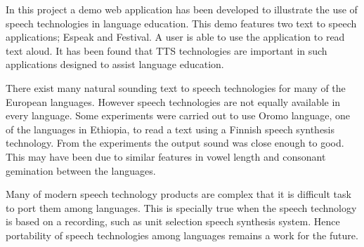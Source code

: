 \documentclass[11pt,a4paper,oneside,article]{memoir}
\begin{document}
In this project a demo web application has been developed to illustrate the use of speech technologies in language education. This demo features two text to speech applications; Espeak and Festival. A user is able to use the application to read text aloud. It has been found that TTS technologies are important in such applications designed to assist language education.

There exist many natural sounding text to speech technologies for many of the European languages. However speech technologies are not equally available in every language. Some experiments were carried out to use Oromo language, one of the languages in Ethiopia, to read a text using a Finnish speech synthesis technology. From the experiments the output sound was close enough to good. This may have been due to similar features in vowel length and consonant gemination between the languages. 

Many of modern speech technology products are complex that it is difficult task to port them among languages. This is specially true when the speech technology is based on a recording, such as unit selection speech synthesis system. Hence portability of speech technologies among languages remains a work for the future. 

%
\clearpage
\end{document}
